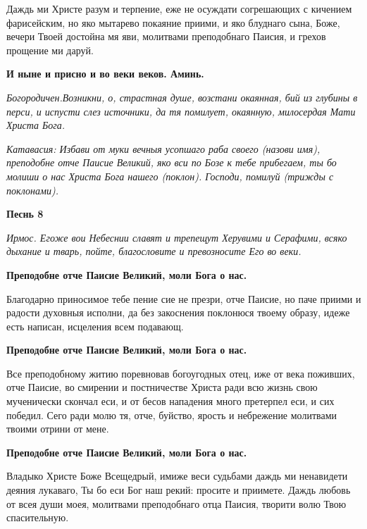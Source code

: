 Даждь ми Христе разум и терпение, еже не осуждати согрешающих с кичением фарисейским, но яко мытарево покаяние приими, и яко блуднаго сына, Боже, вечери Твоей достойна мя яви, молитвами преподобнаго Паисия, и грехов прощение ми даруй.




\bfseries И ныне и присно и во веки веков. Аминь\normalfont{}. 




\itshape Богородичен.\normalfont{}Возникни, о, страстная душе, возстани окаянная, бий из глубины в перси, и испусти слез источники, да тя помилует, окаянную, милосердая Мати Христа Бога. 




\itshape Катавасия:\normalfont{} Избави от муки вечныя усопшаго раба своего (\itshape назови имя\normalfont{}), преподобне отче Паисие Великий, яко вси по Бозе к тебе прибегаем, ты бо молиши о нас Христа Бога нашего (\itshape поклон\normalfont{}). Господи, помилуй (\itshape трижды с поклонами\normalfont{}). 







\bfseries Песнь 8 \normalfont{}




\itshape Ирмос\normalfont{}. Егоже вои Небеснии славят и трепещут Херувими и Серафими, всяко дыхание и тварь, пойте, благословите и превозносите Его во веки. 




\bfseries Преподобне отче Паисие Великий, моли Бога о нас.\normalfont{}


Благодарно приносимое тебе пение сие не презри, отче Паисие, но паче приими и радости духовныя исполни, да без закоснения поклонюся твоему образу, идеже есть написан, исцеления всем подавающ. 




\bfseries Преподобне отче Паисие Великий, моли Бога о нас.\normalfont{}


Все преподобному житию поревновав богоугодных отец, иже от века поживших, отче Паисие, во смирении и постничестве Христа ради всю жизнь свою мученически скончал еси, и от бесов нападения много претерпел еси, и сих победил. Сего ради молю тя, отче, буйство, ярость и небрежение молитвами твоими отрини от мене. 




\bfseries Преподобне отче Паисие Великий, моли Бога о нас.\normalfont{}


Владыко Христе Боже Всещедрый, имиже веси судьбами даждь ми ненавидети деяния лукаваго, Ты бо еси Бог наш рекий: просите и приимете. Даждь любовь от всея души моея, молитвами преподобнаго отца Паисия, творити волю Твою спасительную. 




